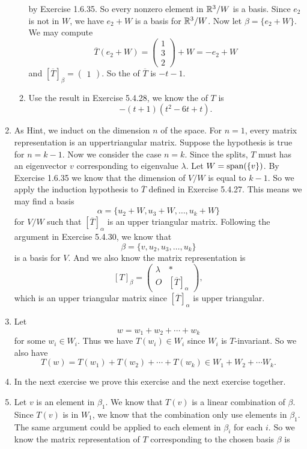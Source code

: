 \begin{enumerate}
\begin{enumerate}
by Exercise 1.6.35. So every nonzero element in $\R^3/W$ is a basis. Since $e_2$ is not in $W$, we have $e_2+W$ is a basis for $\R^3/W$. Now let $\beta=\{e_2+W\}$. We may compute 
\[\overline{T}(e_2+W)=\begin{pmatrix}1\\3\\2\end{pmatrix}+W=-e_2+W\]
and $[\overline{T}]_{\beta}=\begin{pmatrix}1\end{pmatrix}$. So the \charpoly{} of $\overline{T}$ is $-t-1$.
\item Use the result in Exercise 5.4.28, we know the \charpoly{} of $T$ is 
\[-(t+1)(t^2-6t+t).\]
\end{enumerate}
\item As Hint, we induct on the dimension $n$ of the space. For $n=1$, every matrix representation is an uppertriangular matrix. Suppose the hypothesis is true for $n=k-1$. Now we consider the case $n=k$. Since the \charpoly{} splits, $T$ must has an eigenvector $v$ corresponding to eigenvalue $\lambda$. Let $W=\sp(\{v\})$. By Exercise 1.6.35 we know that the dimension of $V/W$ is equal to $k-1$. So we apply the induction hypothesis to $\overline{T}$ defined in Exercise 5.4.27. This means we may find a basis 
\[\alpha=\{u_2+W,u_3+W,\ldots ,u_k+W\}\]
for $V/W$ such that $[\overline{T}]_{\alpha}$ is an upper triangular matrix. Following the argument in Exercise 5.4.30, we know that 
\[\beta=\{v,u_2,u_3,\ldots,u_k\}\]
is a basis for $V$. And we also know the matrix representation is 
\[[T]_{\beta}=\begin{pmatrix}\lambda &*\\O&[\overline{T}]_{\alpha}\end{pmatrix},\]
which is an upper triangular matrix since $[\overline{T}]_{\alpha}$ is upper triangular.
\item Let 
\[w=w_1+w_2+\cdots +w_k\]
for some $w_i\in W_i$. Thus we have $T(w_i)\in W_i$ since $W_i$ is $T$-invariant. So we also have 
\[T(w)=T(w_1)+T(w_2)+\cdots +T(w_k)\in W_1+W_2+\cdots W_k.\]
\item In the next exercise we prove this exercise and the next exercise together.
\item Let $v$ is an element in $\beta_1$. We know that $T(v)$ is a linear combination of $\beta$. Since $T(v)$ is in $W_1$, we know that the combination only use elements in $\beta_1$. The same argument could be applied to each element in $\beta_i$ for each $i$. So we know the matrix representation of $T$ corresponding to the chosen basis $\beta $ is 

\end{enumerate}
